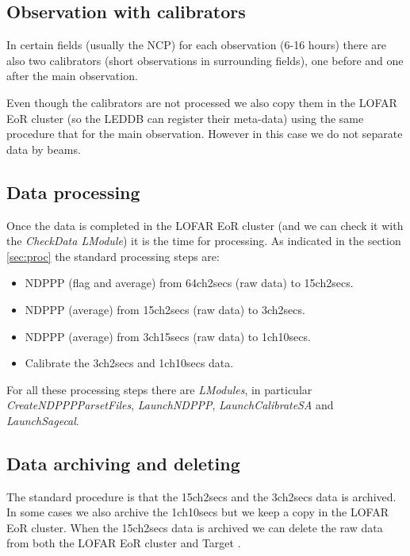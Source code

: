 \documentclass[a4paper,11pt]{article}
\begin{document}
\subsection{Observation with calibrators}

In certain fields (usually the NCP) for each observation (6-16 hours) there are also two calibrators (short observations in surrounding fields), one before and one after the main observation.

Even though the calibrators are not processed we also copy them in the LOFAR EoR cluster (so the LEDDB can register their meta-data) using the same procedure that for the main observation. However in this case we do not separate data by beams.

\subsection{Data processing}

Once the data is completed in the LOFAR EoR cluster (and we can check it with the \textit{CheckData LModule}) it is the time for processing. As indicated in the section \ref{sec:proc} the standard processing steps are:

\begin{itemize}
	\item NDPPP (flag and average) from 64ch2secs (raw data) to 15ch2secs.
	\item NDPPP (average) from 15ch2secs (raw data) to 3ch2secs.
	\item NDPPP (average) from 3ch15secs (raw data) to 1ch10secs.
	\item Calibrate the 3ch2secs and 1ch10secs data.
\end{itemize}

For all these processing steps there are \textit{LModules}, in particular \textit{CreateNDPPPParsetFiles}, \textit{LaunchNDPPP}, \textit{LaunchCalibrateSA} and \textit{LaunchSagecal}.

\subsection{Data archiving and deleting}

The standard procedure is that the 15ch2secs and the 3ch2secs data is archived. In some cases we also archive the 1ch10secs but we keep a copy in the LOFAR EoR cluster. When the 15ch2secs data is archived we can delete the raw data from both the LOFAR EoR cluster and Target .
\end{document}
